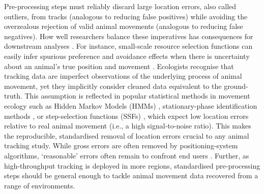 \documentclass[10pt,paper=a4,headings=standardclasses
]{scrartcl}
\begin{document}
Pre-processing steps must reliably discard large location errors, also called outliers, from tracks (analogous to reducing false positives) while avoiding the overzealous rejection of valid animal movements (analogous to reducing false negatives).
How well researchers balance these imperatives has consequences for downstream analyses \citep{stine2001}.
For instance, small-scale resource selection functions can easily infer spurious preference and avoidance effects when there is uncertainty about an animal's true position and movement \citep{visscher2006}.
Ecologists recognise that tracking data are imperfect observations of the underlying process of animal movement, yet they implicitly consider cleaned data equivalent to the ground-truth.
This assumption is reflected in popular statistical methods in movement ecology such as Hidden Markov Models (HMMs) \citep{langrock2012}, stationary-phase identification methods \citep{patin2020a}, or step-selection functions (SSFs) \citep{barnett2008, signer2017, avgar2016}, which expect low location errors relative to real animal movement (i.e., a high signal-to-noise ratio).
This makes the reproducible, standardised removal of location errors crucial to any animal tracking study.
While gross errors are often removed by positioning-system algorithms, ‘reasonable’ errors often remain to confront end users \citep{fischler1981, weiser2016, ranacher2016}.
Further, as high-throughput tracking is deployed in more regions, standardised pre-processing steps should be general enough to tackle animal movement data recovered from a range of environments.
\end{document}
